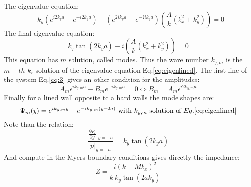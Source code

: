 The eigenvalue equation:
\begin{equation}
    -k_y(e^{i2k_ya}-e^{-i2k_ya})-(e^{2ik_ya}+e^{-2ik_ya})(\frac{A}{k}(k_x^2+k_y^2))=0
\end{equation}
The final eigenvalue equation:
\begin{equation} \label{eq:eigenlined}
    k_y\tan(2k_ya) -i(\frac{A}{k}(k_x^2+k_y^2))=0
\end{equation}
This equation has $m$ solution, called modes. Thus the wave number $k_{y,m}$ is the $m-th$ $k_r$ solution of the eigenvalue equation Eq.\eqref{eq:eigenlined}. 
The first line of the system Eq.\eqref{eq:3} gives an other condition for the amplitudes:
\begin{equation}
    A_me^{ik_{y,m}a}-B_me^{-ik_{y,m}a}=0 \iff  B_m=A_me^{i2k_{y,m}a}
\end{equation}
Finally for a lined wall opposite to a hard walls the mode shapes are: 
\begin{equation}
    \Psi_{m}(y)=e^{ik_{y,m}y}-e^{-ik_{y,m}(y-2a)}\ \text{with}\ k_{y,m} \ \text{solution of} \ Eq.\eqref{eq:eigenlined}
\end{equation}
Note than the relation:
\begin{equation}
   \frac{\frac{\partial\Psi_{l}}{\partial y}|_{y=-a}}{p|_{y=-a}}=k_y\tan(2k_ya)
\end{equation}
And compute in the Myers boundary conditions gives directly the impedance:
\begin{equation}\label{eq:Impedance}
   Z=\frac{i(k-Mk_x)^2}{k\ k_y\tan(2ak_y)}
\end{equation}
